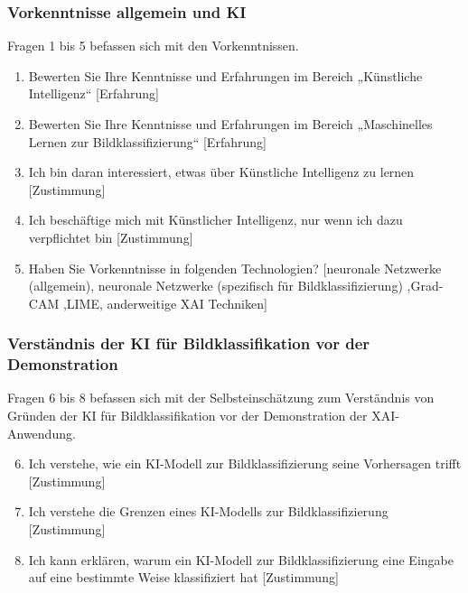 \subsubsection{Vorkenntnisse allgemein und KI}
Fragen 1 bis 5 befassen sich mit den Vorkenntnissen. 
\begin{enumerate}
    \setcounter{enumi}{0}
    \item  Bewerten Sie Ihre Kenntnisse und Erfahrungen im Bereich „Künstliche Intelligenz“ [Erfahrung]
    \item  Bewerten Sie Ihre Kenntnisse und Erfahrungen im Bereich „Maschinelles Lernen zur Bildklassifizierung“ [Erfahrung]
    \item  Ich bin daran interessiert, etwas über Künstliche Intelligenz zu lernen [Zustimmung]
    \item  Ich beschäftige mich mit Künstlicher Intelligenz, nur wenn ich dazu verpflichtet bin [Zustimmung]
    \item  Haben Sie Vorkenntnisse in folgenden Technologien? [neuronale Netzwerke (allgemein), neuronale Netzwerke (spezifisch für Bildklassifizierung) ,Grad-CAM ,LIME, anderweitige XAI Techniken]
\end{enumerate}
\subsubsection{Verständnis der KI für Bildklassifikation vor der Demonstration}
Fragen 6 bis 8 befassen sich mit der Selbsteinschätzung zum Verständnis von Gründen der KI für Bildklassifikation vor der Demonstration der XAI-Anwendung.
\begin{enumerate}
    \setcounter{enumi}{5}
    \item  Ich verstehe, wie ein KI-Modell zur Bildklassifizierung seine Vorhersagen trifft  [Zustimmung]
    \item  Ich verstehe die Grenzen eines KI-Modells zur Bildklassifizierung  [Zustimmung]
    \item  Ich kann erklären, warum ein KI-Modell zur Bildklassifizierung eine Eingabe auf eine bestimmte Weise klassifiziert hat [Zustimmung]
\end{enumerate}

